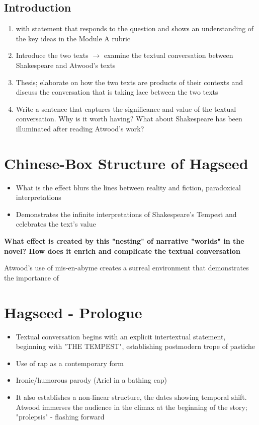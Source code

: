 	\subsection{Introduction}
	
		\begin{enumerate}
			\item with statement that responds to the question and shows an understanding of the key ideas in the Module A rubric
			\item Introduce the two texts $\rightarrow$ examine the textual conversation between Shakespeare and Atwood's texts
			\item Thesis; elaborate on how the two texts are products of their contexts and discuss the conversation that is taking lace between the two texts
			\item Write a sentence that captures the significance and value of the textual conversation. Why is it worth having? What about Shakespeare has been illuminated after reading Atwood's work? 
		\end{enumerate}

\section{Chinese-Box Structure of Hagseed}

	\begin{itemize}
		\item What is the effect blurs the lines between reality and fiction, paradoxical interpretations
		\item Demonstrates the infinite interpretations of Shakespeare's Tempest and celebrates the text's value
	\end{itemize}

	\textbf{What effect is created by this "nesting" of narrative "worlds" in the novel? How does it enrich and complicate the textual conversation}

	Atwood's use of mis-en-abyme creates a surreal environment that demonstrates the importance of

\section{Hagseed - Prologue}

	\begin{itemize}
		\item Textual conversation begins with an explicit intertextual statement, beginning with "THE TEMPEST", establishing postmodern trope of pastiche
		\item Use of rap as a contemporary form
		\item Ironic/humorous parody (Ariel in a bathing cap)
		\item It also establishes a non-linear structure, the dates showing temporal shift. Atwood immerses the audience in the climax at the beginning of the story; "prolepsis" - flashing forward
	\end{itemize}

